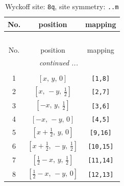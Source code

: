 \documentclass[fleqn,8pt]{jsarticle}
\begin{document}
\begin{longtable}{ccc}
\caption{Wyckoff site: {\tt 8q}, site symmetry: {\tt ..m}}
 \\
 \hline \hline
No. & position & mapping \\ \hline \endfirsthead

\multicolumn{2}{l}{\tablename\ \thetable{}} \\
 \hline \hline
No. & position & mapping \\ \hline \endhead

 \hline \hline
\multicolumn{2}{r}{\footnotesize\it continued ...} \\ \endfoot

 \hline \hline
\multicolumn{2}{r}{} \\ \endlastfoot

1 & $\left[ x,\, y,\, 0 \right]$ & {\tt [1,8]} \\ \hline
2 & $\left[ x,\, - y,\, \frac{1}{2} \right]$ & {\tt [2,7]} \\ \hline
3 & $\left[ - x,\, y,\, \frac{1}{2} \right]$ & {\tt [3,6]} \\ \hline
4 & $\left[ - x,\, - y,\, 0 \right]$ & {\tt [4,5]} \\ \hline
5 & $\left[ x + \frac{1}{2},\, y,\, 0 \right]$ & {\tt [9,16]} \\ \hline
6 & $\left[ x + \frac{1}{2},\, - y,\, \frac{1}{2} \right]$ & {\tt [10,15]} \\ \hline
7 & $\left[ \frac{1}{2} - x,\, y,\, \frac{1}{2} \right]$ & {\tt [11,14]} \\ \hline
8 & $\left[ \frac{1}{2} - x,\, - y,\, 0 \right]$ & {\tt [12,13]} \\
\end{longtable}
\renewcommand{\arraystretch}{1.2}
\end{document}
